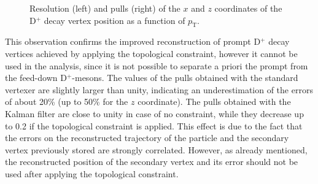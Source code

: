 \documentclass[b5paper,10pt,twoside,oldstyle,classica]{toptesi}
\newcommand{\pt}{p_\text{T}}
\begin{document}
\begin{figure}[tb]
\begin{center}
\caption{Resolution (left) and pulls (right) of the $x$ and $z$ coordinates of the D$^+$ decay vertex position as a function of $\pt$.}
\label{KF_decayvtx}
\end{center}
\end{figure} This observation confirms the improved reconstruction of prompt D$^+$ decay vertices achieved by applying the topological constraint, however it cannot be used in the analysis, since it is not possible to separate a priori the prompt from the feed-down D$^+$-mesons. The values of the pulls obtained with the standard vertexer are slightly larger than unity, indicating an underestimation of the errors of about 20\% (up to 50\% for the $z$ coordinate). The pulls obtained with the Kalman filter are close to unity in case of no constraint, while they decrease up to 0.2 if the topological constraint is applied. This effect is due to the fact that the errors on the reconstructed trajectory of the particle and the secondary vertex previously stored are strongly correlated. However, as already mentioned, the reconstructed position of the secondary vertex and its error should not be used after applying the topological constraint. 
\end{document}
